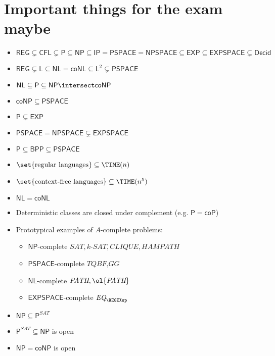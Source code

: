 \documentclass{scrartcl}
\begin{document}
\chapter{Important things for the exam maybe}
\begin{itemize}
	\item \(\mathsf{REG} \subsetneq \mathsf{CFL} \subsetneq \mathsf{P} \subseteq \mathsf{NP} \subseteq \mathsf{IP} = \mathsf{PSPACE} = \mathsf{NPSPACE} \subseteq \mathsf{EXP} \subseteq \mathsf{EXPSPACE} \subsetneq \mathsf{Decid}\)
	\item \(\mathsf{REG} \subsetneq \mathsf{L} \subseteq \mathsf{NL} = \mathsf{coNL} \subseteq \mathsf{L}^2 \subsetneq \mathsf{PSPACE}\)
	\item \(\mathsf{NL} \subseteq \mathsf{P} \subseteq \mathsf{NP} \intersect \mathsf{coNP}\)
	\item \(\mathsf{coNP} \subseteq \mathsf{PSPACE}\)
	\item \(\mathsf{P} \subsetneq \mathsf{EXP}\)
	\item \(\mathsf{PSPACE} = \mathsf{NPSPACE} \subsetneq \mathsf{EXPSPACE}\)
	\item \(\mathsf{P} \subseteq \mathsf{BPP} \subseteq \mathsf{PSPACE}\)
	\item \(\set{\text{regular languages}} \subseteq \TIME(n)\)
	\item \(\set{\text{context-free languages}} \subseteq \TIME(n^5)\)
	\item \(\mathsf{NL} = \mathsf{coNL}\)
	\item Deterministic classes are closed under complement (e.g. \(\mathsf{P} = \mathsf{coP}\))
	\item Prototypical examples of \(A\)-complete problems:
	\begin{itemize}[nosep]
		\item \(\mathsf{NP}\)-complete \(\textit{SAT}, \textit{$k$-SAT}, \textit{CLIQUE}, \textit{HAMPATH}\)
		\item \(\mathsf{PSPACE}\)-complete \(\textit{TQBF}, \textit{GG}\)
		\item \(\mathsf{NL}\)-complete \(\textit{PATH}, \ol{\textit{PATH}}\)
		\item \(\mathsf{EXPSPACE}\)-complete \(\textit{EQ}_{\REGEXup}\)
	\end{itemize}
	\item \(\mathsf{NP} \subseteq \mathsf{P}^{\textit{SAT}}\)
	\item \(\mathsf{P}^{\textit{SAT}} \subseteq \mathsf{NP}\) is open
	\item \(\mathsf{NP} = \mathsf{coNP}\) is open

\end{itemize}
\end{document}
